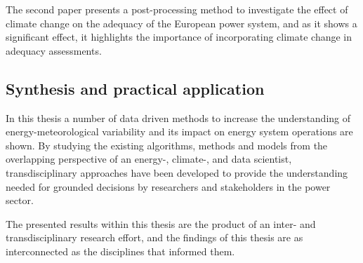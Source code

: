 The second paper presents a post-processing method to investigate the effect of climate change on the adequacy of the European power system, and as it shows a significant effect, it highlights the importance of incorporating climate change in adequacy assessments.

\subsection*{Synthesis and practical application}
In this thesis a number of data driven methods to increase the understanding of energy-meteorological variability and its impact on energy system operations are shown.
By studying the existing algorithms, methods and models from the overlapping perspective of an energy-, climate-, and data scientist, transdisciplinary approaches have been developed to provide the understanding needed for grounded decisions by researchers and stakeholders in the power sector.



The presented results within this thesis are the product of an inter- and transdisciplinary research effort, and the findings of this thesis are as interconnected as the disciplines that informed them.

